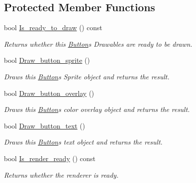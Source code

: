 \subsection*{Protected Member Functions}
\begin{DoxyCompactItemize}
\item 
bool \hyperlink{classjetfuel_1_1gui_1_1Button_a1572eec073adf699c280ffa784fa7459}{Is\+\_\+ready\+\_\+to\+\_\+draw} () const
\begin{DoxyCompactList}\small\item\em Returns whether this \hyperlink{classjetfuel_1_1gui_1_1Button}{Button}\textquotesingle{}s Drawables are ready to be drawn. \end{DoxyCompactList}\item 
bool \hyperlink{classjetfuel_1_1gui_1_1Button_a548ffd5860aced3206da4c210b5496c9}{Draw\+\_\+button\+\_\+sprite} ()
\begin{DoxyCompactList}\small\item\em Draws this \hyperlink{classjetfuel_1_1gui_1_1Button}{Button}\textquotesingle{}s Sprite object and returns the result. \end{DoxyCompactList}\item 
bool \hyperlink{classjetfuel_1_1gui_1_1Button_ae1e89337652fc30fb7c4997f5b887da3}{Draw\+\_\+button\+\_\+overlay} ()
\begin{DoxyCompactList}\small\item\em Draws this \hyperlink{classjetfuel_1_1gui_1_1Button}{Button}\textquotesingle{}s color overlay object and returns the result. \end{DoxyCompactList}\item 
bool \hyperlink{classjetfuel_1_1gui_1_1Button_ae001860ae9ce670073a4608811e70cfe}{Draw\+\_\+button\+\_\+text} ()
\begin{DoxyCompactList}\small\item\em Draws this \hyperlink{classjetfuel_1_1gui_1_1Button}{Button}\textquotesingle{}s text object and returns the result. \end{DoxyCompactList}\item 
bool \hyperlink{classjetfuel_1_1gui_1_1Button_ac6e616b98179911dd626b018e54b08d7}{Is\+\_\+render\+\_\+ready} () const
\begin{DoxyCompactList}\small\item\em Returns whether the renderer is ready. \end{DoxyCompactList}\end{DoxyCompactItemize}


